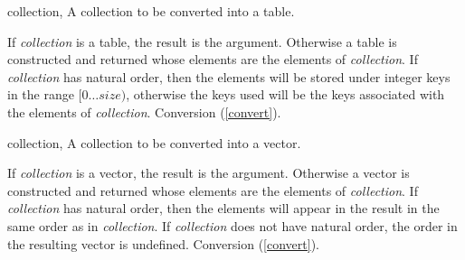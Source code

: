 \begin{optDefinition}
%
\begin{specargs}
    \item[collection, \classref{collection}] A collection to be converted into a
    table.
\end{specargs}
%
\result%
If {\em collection\/} is a table, the result is the argument.  Otherwise
a table is constructed and returned whose elements are the elements of {\em
    collection}.  If {\em collection\/} has natural order, then the elements
will be stored under integer keys in the range $[0\ldots{}size)$, otherwise the
keys used will be the keys associated with the elements of {\em collection}.
%
\seealso%
Conversion (\ref{convert}).

%
\begin{specargs}
    \item[collection, \classref{collection}] A collection to be converted into a
    vector.
\end{specargs}
%
\result%
If {\em collection\/} is a vector, the result is the argument.
Otherwise a vector is constructed and returned whose elements are the elements
of {\em collection}.  If {\em collection\/} has natural order, then the elements
will appear in the result in the same order as in {\em collection}.  If {\em
    collection\/} does not have natural order, the order in the resulting vector
is undefined.
%
\seealso%
Conversion (\ref{convert}).
%
\end{optDefinition}
